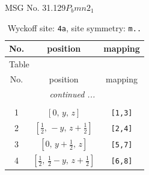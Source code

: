 \documentclass[fleqn,8pt]{jsarticle}
\begin{document}
\setcounter{MaxMatrixCols}{32}

\renewcommand{\tablename}{Table~}
\renewcommand{\figurename}{Figure~}
\begin{center}
\LARGE
MSG No. 31.129\quad$P_{b}mn2_{1}$
\end{center}
\renewcommand{\arraystretch}{1.2}
\begin{longtable}{ccc}
\caption{Wyckoff site: {\tt 4a}, site symmetry: {\tt m..}}
 \\
 \hline \hline
No. & position & mapping \\ \hline \endfirsthead

\multicolumn{2}{l}{\tablename\ \thetable{}} \\
 \hline \hline
No. & position & mapping \\ \hline \endhead

 \hline \hline
\multicolumn{2}{r}{\footnotesize\it continued ...} \\ \endfoot

 \hline \hline
\multicolumn{2}{r}{} \\ \endlastfoot

1 & $\left[ 0,\, y,\, z \right]$ & {\tt [1,3]} \\ \hline
2 & $\left[ \frac{1}{2},\, - y,\, z + \frac{1}{2} \right]$ & {\tt [2,4]} \\ \hline
3 & $\left[ 0,\, y + \frac{1}{2},\, z \right]$ & {\tt [5,7]} \\ \hline
4 & $\left[ \frac{1}{2},\, \frac{1}{2} - y,\, z + \frac{1}{2} \right]$ & {\tt [6,8]} \\
\end{longtable}
\renewcommand{\arraystretch}{1.2}
\end{document}
